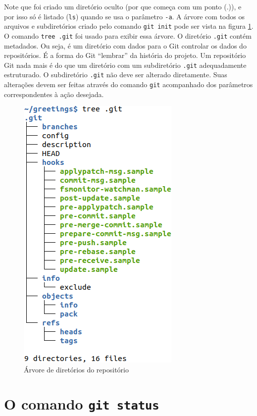 \documentclass[a4paper]{book}
\begin{document}
Note que foi criado um diretório oculto (por que começa com
um ponto (.)), e por isso só é listado (\texttt{ls}) quando
se usa o parâmetro \texttt{-a}. A árvore com todos os arquivos
e subdiretórios criado pelo comando \texttt{git init} pode ser
vista na figura \ref{fig:02}. O comando \texttt{tree .git} foi
usado para exibir essa árvore. O diretório \texttt{.git} contém
metadados. Ou seja, é um diretório com dados para o Git
controlar os dados do repositórios. É a forma do Git
``lembrar'' da história do projeto.
Um repositório Git nada mais é do que um diretório com um
subdiretório \texttt{.git} adequadamente estruturado.
O subdiretório \texttt{.git} não deve ser alterado diretamente.
Suas alterações devem ser feitas através do comando
\texttt{git} acompanhado dos parâmetros correspondentes à ação
desejada.

\begin{figure}[ht]
\caption{Árvore de diretórios do repositório}
\label{fig:02}
\centering
\includegraphics[scale=0.6,left]{"images/02-Árvore de diretórios do repositório.png"}
\end{figure}

\section{O comando \texttt{git status}}
\end{document}
